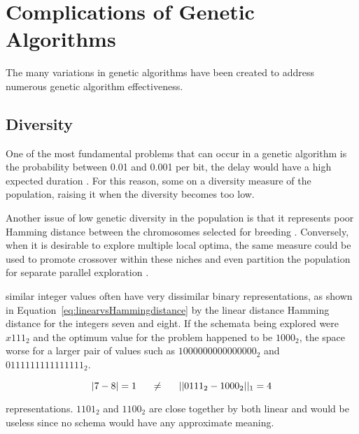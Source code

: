 \chapter{Complications of Genetic Algorithms}
The many variations in genetic algorithms have been created to address numerous genetic algorithm effectiveness.

\section{Diversity}
One of the most fundamental problems that can occur in a genetic algorithm is the probability between 0.01 and 0.001 per bit, the delay would have a high expected duration \cite{re:mutationrate1}\cite{re:mutationrate2}.  For this reason, some on a diversity measure of the population, raising it when the diversity becomes too low.

Another issue of low genetic diversity in the population is that it represents poor Hamming distance between the chromosomes selected for breeding \cite{re:diversityincrossover}.  Conversely, when it is desirable to explore multiple local optima, the same measure could be used to promote crossover within these niches and even partition the population for separate parallel exploration \cite{re:parallelGAniche}.

similar integer values often have very dissimilar binary representations, as shown in Equation~\ref{eq:linearvsHammingdistance} by the linear distance Hamming distance for the integers seven and eight.  If the schemata being explored were $x111_2$ and the optimum value for the problem happened to be $1000_2$, the space worse for a larger pair of values such as $1000000000000000_2$ and $0111111111111111_2$.

	\begin{equation}
		\label{eq:linearvsHammingdistance}
		|7 - 8| = 1 \hspace*{1.5em} \neq \hspace*{1.5em} ||0111_2-1000_2||_1 = 4
	\end{equation}

representations.  $1101_2$ and $1100_2$ are close together by both linear and would be useless since no schema would have any approximate meaning.